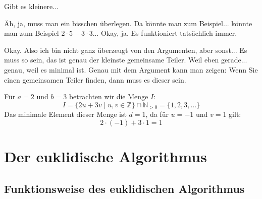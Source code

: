 \begin{student-interaction}[Studentenfrage]
Gibt es kleinere...
\end{student-interaction}

\begin{spoken-clean}[00:27:35 - 00:28:27]
Äh, ja, muss man ein bisschen überlegen. Da könnte man zum Beispiel... könnte man zum Beispiel $2 \cdot 5 - 3 \cdot 3$... Okay, ja. Es funktioniert tatsächlich immer.

Okay. Also ich bin nicht ganz überzeugt von den Argumenten, aber sonst... Es muss so sein, das ist genau der kleinste gemeinsame Teiler. Weil eben gerade... genau, weil es minimal ist. Genau mit dem Argument kann man zeigen: Wenn Sie einen gemeinsamen Teiler finden, dann muss es dieser sein.
\end{spoken-clean}

\begin{math-stroke}
Für $a = 2$ und $b = 3$ betrachten wir die Menge $I$:
\[ I = \{ 2u + 3v \mid u, v \in \mathbb{Z} \} \cap \mathbb{N}_{>0} = \{1, 2, 3, \dots\} \]
Das minimale Element dieser Menge ist $d = 1$, da für $u = -1$ und $v = 1$ gilt:
\[ 2 \cdot (-1) + 3 \cdot 1 = 1 \]
\end{math-stroke}

\section{Der euklidische Algorithmus}

\subsection{Funktionsweise des euklidischen Algorithmus}

